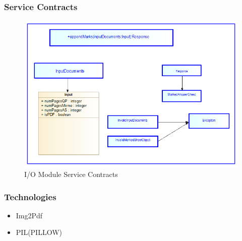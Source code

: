 \documentclass{article}
\begin{document}
		\subsubsection{Service Contracts}
					\begin{figure}[h]
				\includegraphics[scale=0.6]{Images/IO_Module/IOModuleServiceContracts}
				\caption{I/O Module Service Contracts}
			\end{figure}
			
		\subsubsection{Technologies}
					\begin{itemize}
				\item Img2Pdf
				\item PIL(PILLOW)
			\end{itemize}
		
\end{document}
